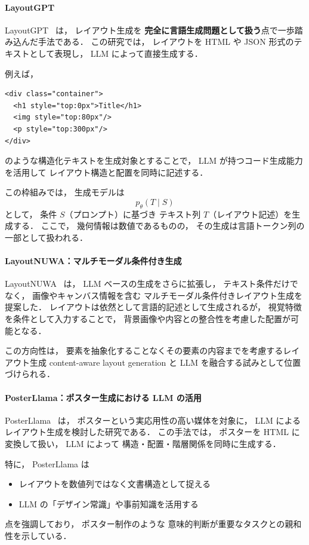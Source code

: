 \documentclass[a4j,12pt,dvipdfmx]{jsreport}
\begin{document}
\paragraph{LayoutGPT}
LayoutGPT~\cite{feng_layoutgpt_2023} は，
レイアウト生成を
\textbf{完全に言語生成問題として扱う}点で一歩踏み込んだ手法である．
この研究では，
レイアウトを HTML や JSON 形式のテキストとして表現し，
LLM によって直接生成する．

例えば，
\begin{verbatim}
<div class="container">
  <h1 style="top:0px">Title</h1>
  <img style="top:80px"/>
  <p style="top:300px"/>
</div>
\end{verbatim}
のような構造化テキストを生成対象とすることで，
LLM が持つコード生成能力を活用して
レイアウト構造と配置を同時に記述する．

この枠組みでは，
生成モデルは
\[
   p_\theta(T \mid S)
\]
として，
条件 $S$（プロンプト）に基づき
テキスト列 $T$（レイアウト記述）を生成する．
ここで，
幾何情報は数値であるものの，
その生成は言語トークン列の一部として扱われる．

\paragraph{LayoutNUWA：マルチモーダル条件付き生成}
LayoutNUWA~\cite{tang2023layoutnuwa} は，
LLM ベースの生成をさらに拡張し，
テキスト条件だけでなく，
画像やキャンバス情報を含む
マルチモーダル条件付きレイアウト生成を提案した．
レイアウトは依然として言語的記述として生成されるが，
視覚特徴を条件として入力することで，
背景画像や内容との整合性を考慮した配置が可能となる．

この方向性は，
要素を抽象化することなくその要素の内容までを考慮するレイアウト生成 content-aware layout generation と
LLM を融合する試みとして位置づけられる．

\paragraph{PosterLlama：ポスター生成における LLM の活用}
PosterLlama~\cite{seol_posterllama_2024} は，
ポスターという実応用性の高い媒体を対象に，
LLM によるレイアウト生成を検討した研究である．
この手法では，
ポスターを HTML に変換して扱い，
LLM によって
構造・配置・階層関係を同時に生成する．

特に，
PosterLlama は
\begin{itemize}
   \item レイアウトを数値列ではなく文書構造として捉える
   \item LLM の「デザイン常識」や事前知識を活用する
\end{itemize}
点を強調しており，
ポスター制作のような
意味的判断が重要なタスクとの親和性を示している．
\end{document}

